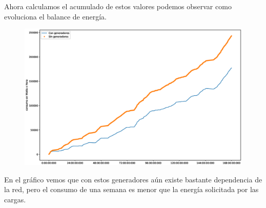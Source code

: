 Ahora calculamos el acumulado de estos valores podemos observar como evoluciona el
balance de energía. 

\begin{figure}[H]
    \centering
    \includegraphics[scale=0.3]{images/compWW.eps}
\end{figure}

En el gráfico vemos que con estos generadores aún existe bastante dependencia de la red,
pero el consumo de una semana es menor que la energía solicitada por las cargas.